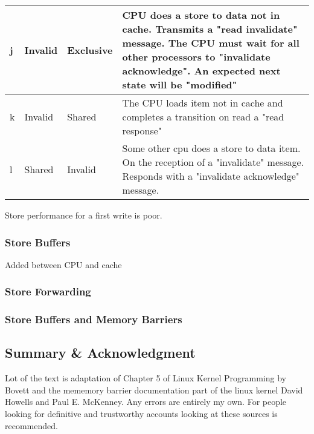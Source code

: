 \documentclass{article}
\begin{document}
\begin{tabular} {| l | l | l | p{9cm}| }
    \hline

    j & Invalid & Exclusive &

    CPU does a store to data not in cache. Transmits a "read
    invalidate" message. The CPU must wait for all other processors to
    "invalidate acknowledge". An expected next state will be
    "modified"  
    \\
    \hline

    k & Invalid & Shared &
    
    The CPU loads item not in cache and completes a transition on read
    a "read response"     \\


    \hline
    l & Shared & Invalid &
    
    Some other cpu does a store to data item. On the reception of a
    "invalidate" message. Responds with a "invalidate acknowledge"
    message. \\

    \hline    
\end{tabular}




Store performance for a first write is poor.


\subsubsection{Store Buffers}
Added between CPU and cache
\subsubsection{Store Forwarding}
\subsubsection{Store Buffers and Memory Barriers}


\subsection{Summary \& Acknowledgment}

Lot of the text is adaptation of Chapter 5 of Linux Kernel Programming
by Bovett and the mememory barrier documentation part of the linux
kernel David Howells and Paul E. McKenney. Any errors are entirely my
own. For people looking for definitive and trustworthy accounts
looking at these sources is recommended.
\end{document}

